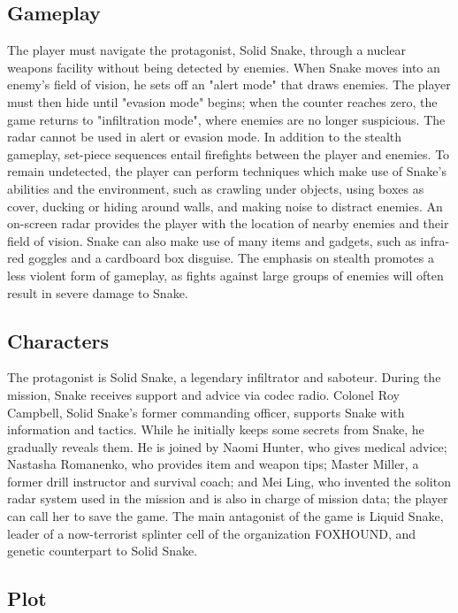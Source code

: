 \documentclass[a4paper,10pt]{book}
\begin{document}
 \subsection{Gameplay }
 
          The player must navigate the protagonist, Solid Snake, through a nuclear weapons facility without being detected by enemies. When Snake moves into an enemy's field of vision, he sets off an "alert mode" that draws enemies. The player must then hide until "evasion mode" begins; when the counter reaches zero, the game returns to "infiltration mode", where enemies are no longer suspicious. The radar cannot be used in alert or evasion mode. In addition to the stealth gameplay, set-piece sequences entail firefights between the player and enemies.  
          To remain undetected, the player can perform techniques which make use of Snake's abilities and the environment, such as crawling under objects, using boxes as cover, ducking or hiding around walls, and making noise to distract enemies. An on-screen radar provides the player with the location of nearby enemies and their field of vision. 
          Snake can also make use of many items and gadgets, such as infra-red goggles and a cardboard box disguise. The emphasis on stealth promotes a less violent form of gameplay, as fights against large groups of enemies will often result in severe damage to Snake.
         
 \subsection{Characters }
 
          The protagonist is Solid Snake, a legendary infiltrator and saboteur. During the mission, Snake receives support and advice via codec radio. Colonel Roy Campbell, Solid Snake's former commanding officer, supports Snake with information and tactics. While he initially keeps some secrets from Snake, he gradually reveals them. 
           He is joined by Naomi Hunter, who gives medical advice; Nastasha Romanenko, who provides item and weapon tips; Master Miller, a former drill instructor and survival coach; and Mei Ling, who invented the soliton radar system used in the mission and is also in charge of mission data; the player can call her to save the game. 
           The main antagonist of the game is Liquid Snake, leader of a now-terrorist splinter cell of the organization FOXHOUND, and genetic counterpart to Solid Snake.
         
 \subsection{Plot }
 
\end{document}
